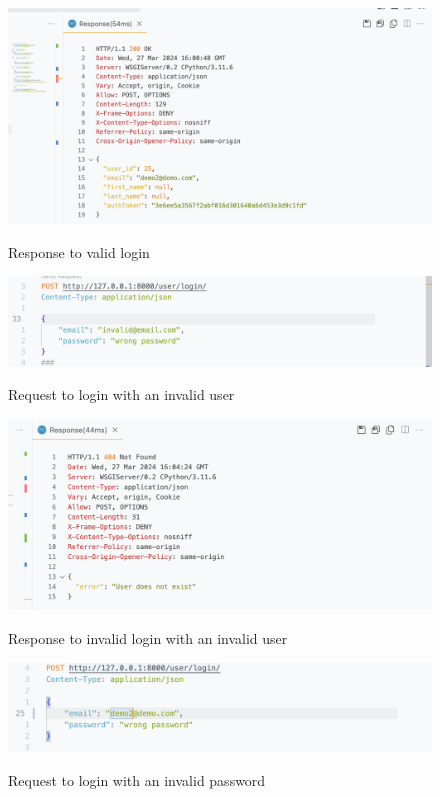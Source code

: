 \begin{figure}[H]
    \caption{Response to valid login}
    \includegraphics[width=\textwidth]{Assets/api_test/response_login_sucessful.png}
    \label{fig:response_login_sucessful}
\end{figure}

\begin{figure}[H]
    \caption{Request to login with an invalid user}
    \includegraphics[width=\textwidth]{Assets/api_test/request_login_invalid_user.png}
    \label{fig:request_login_invalid_user}
\end{figure}

\begin{figure}[H]
    \caption{Response to invalid login with an invalid user}
    \includegraphics[width=\textwidth]{Assets/api_test/response_login_invalid_user.png}
    \label{fig:response_login_invalid_user}
\end{figure}

\begin{figure}[H]
    \caption{Request to login with an invalid password}
    \includegraphics[width=\textwidth]{Assets/api_test/request_login_invalid_password.png}
    \label{fig:request_login_invalid_password}
\end{figure}

